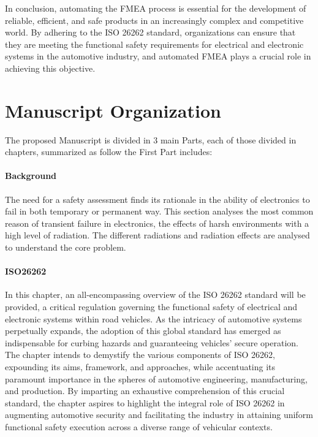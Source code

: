 \documentclass[./dissertation.tex]{subfiles}
\begin{document}
In conclusion, automating the FMEA process is essential for the development of reliable, efficient, and safe products in an increasingly complex and competitive world. By adhering to the ISO 26262 standard, organizations can ensure that they are meeting the functional safety requirements for electrical and electronic systems in the automotive industry, and automated FMEA plays a crucial role in achieving this objective.


\section{Manuscript Organization}
The proposed Manuscript is divided in 3 main Parts, each of those divided in chapters, summarized as follow
the First Part includes:

\paragraph{Background}
The need for a safety assessment finds its rationale in the ability of electronics to fail in both temporary or permanent way. This section analyses the most common reason of transient failure in electronics, the effects of harsh environments with a high level of radiation. The different radiations and radiation effects are analysed to understand the core problem.
\paragraph{ISO26262}
In this chapter, an all-encompassing overview of the ISO 26262 standard will be provided, a critical regulation governing the functional safety of electrical and electronic systems within road vehicles. As the intricacy of automotive systems perpetually expands, the adoption of this global standard has emerged as indispensable for curbing hazards and guaranteeing vehicles' secure operation. The chapter intends to demystify the various components of ISO 26262, expounding its aims, framework, and approaches, while accentuating its paramount importance in the spheres of automotive engineering, manufacturing, and production. By imparting an exhaustive comprehension of this crucial standard, the chapter aspires to highlight the integral role of ISO 26262 in augmenting automotive security and facilitating the industry in attaining uniform functional safety execution across a diverse range of vehicular contexts.
\end{document}
